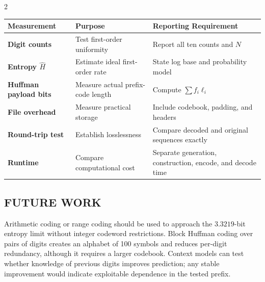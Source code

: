 \begin{multicols}{2}
\begin{center}
\vspace{-0.5em}
\begin{minipage}{0.98\columnwidth}
\centering
    \scriptsize
    \setlength{\tabcolsep}{2pt}
    \renewcommand{\arraystretch}{1.25}
    \begin{tabular}{@{}>{\bfseries\RaggedRight\arraybackslash}p{}
                        >{\RaggedRight\arraybackslash}p{}
                        >{\RaggedRight\arraybackslash}p{}@{}}
      \toprule
      \textbf{Measurement} & \textbf{Purpose} & \textbf{Reporting Requirement} \\
      \midrule
      Digit counts & Test first-order uniformity & Report all ten counts and $N$ \\
      Entropy $\hat{H}$ & Estimate ideal first-order rate & State log base and probability model \\
      Huffman payload bits & Measure actual prefix-code length & Compute $\sum f_i\ell_i$ \\
      File overhead & Measure practical storage & Include codebook, padding, and headers \\
      Round-trip test & Establish losslessness & Compare decoded and original sequences exactly \\
      Runtime & Compare computational cost & Separate generation, construction, encode, and decode time \\
      \bottomrule
    \end{tabular}
\end{minipage}
  \end{center}
\vspace{-0.35em}

  \subsection*{\centering\uppercase{Future Work}}
  Arithmetic coding or range coding should be used to approach the $3.3219$-bit entropy limit without integer codeword restrictions. Block Huffman coding over pairs of digits creates an alphabet of 100 symbols and reduces per-digit redundancy, although it requires a larger codebook. Context models can test whether knowledge of previous digits improves prediction; any stable improvement would indicate exploitable dependence in the tested prefix.



\end{multicols}
